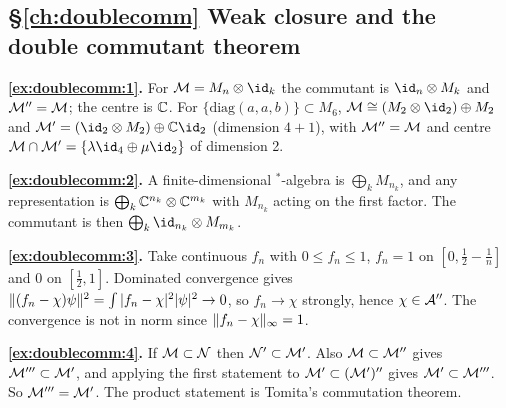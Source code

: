 {\subsection*{\S\ref{ch:doublecomm} Weak closure and the double commutant theorem}
\textbf{\ref{ex:doublecomm:1}.} For $\M=M_n\otimes\id_k$ the commutant is $\id_n\otimes M_k$ and $\mathcal{M}''=\mathcal{M}$; the centre is $\mathbb{C}$. For $\{\mathrm{diag}(a,a,b)\}\subset M_6$, $\M\cong(M_2\otimes\id_2)\oplus M_2$ and $\M'=(\id_2\otimes M_2)\oplus\C\id_2$ (dimension $4+1$), with $\mathcal{M}''=\mathcal{M}$ and centre $\M\cap\M'=\{\lambda\id_4\oplus\mu\id_2\}$ of dimension 2.\par
\textbf{\ref{ex:doublecomm:2}.} A finite-dimensional $^*$-algebra is $\bigoplus_kM_{n_k}$, and any representation is $\bigoplus_k\mathbb{C}^{n_k}\otimes\mathbb{C}^{m_k}$ with $M_{n_k}$ acting on the first factor. The commutant is then $\bigoplus_k\id_{n_k}\otimes M_{m_k}$.\par
\textbf{\ref{ex:doublecomm:3}.} Take continuous $f_n$ with $0\le f_n\le1$, $f_n=1$ on $[0,\frac12-\frac1n]$ and $0$ on $[\frac12,1]$. Dominated convergence gives $\lVert (f_n-\chi)\psi\rVert^2=\int|f_n-\chi|^2|\psi|^2\to0$, so $f_n\to\chi$ strongly, hence $\chi\in\mathcal{A}''$. The convergence is not in norm since $\lVert f_n-\chi\rVert_\infty=1$.\par
\textbf{\ref{ex:doublecomm:4}.} If $\mathcal{M}\subset\mathcal N$ then $\mathcal N'\subset\mathcal{M}'$. Also $\mathcal{M}\subset\mathcal{M}''$ gives $\mathcal{M}'''\subset\mathcal{M}'$, and applying the first statement to $\mathcal{M}'\subset(\mathcal{M}')''$ gives $\mathcal{M}'\subset\mathcal{M}'''$. So $\mathcal{M}'''=\mathcal{M}'$. The product statement is Tomita's commutation theorem.\par

}
